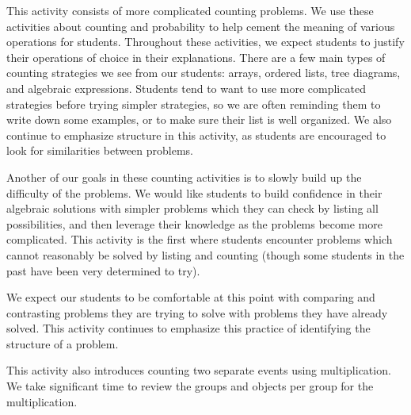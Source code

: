 \documentclass[nooutcomes]{ximera}
\begin{document}
\begin{instructorNotes}
This activity consists of more complicated counting problems.  We use these activities about counting and probability to help cement the meaning of various operations for students.  Throughout these activities, we expect students to justify their operations of choice in their explanations.  There are a few main types of counting strategies we see from our students: arrays, ordered lists, tree diagrams, and algebraic expressions.  Students tend to want to use more complicated strategies before trying simpler strategies, so we are often reminding them to write down some examples, or to make sure their list is well organized.  We also continue to emphasize structure in this activity, as students are encouraged to look for similarities between problems.


Another of our goals in these counting activities is to slowly build up the difficulty of the problems. We would like students to build confidence in their algebraic solutions with simpler problems which they can check by listing all possibilities, and then leverage their knowledge as the problems become more complicated.  This activity is the first where students encounter problems which cannot reasonably be solved by listing and counting (though some students in the past have been very determined to try).  

We expect our students to be comfortable at this point with comparing and contrasting problems they are trying to solve with problems they have already solved.  This activity continues to emphasize this practice of identifying the structure of a problem.

This activity also introduces counting two separate events using multiplication.  We take significant time to review the groups and objects per group for the multiplication.


\end{instructorNotes}
\end{document}
